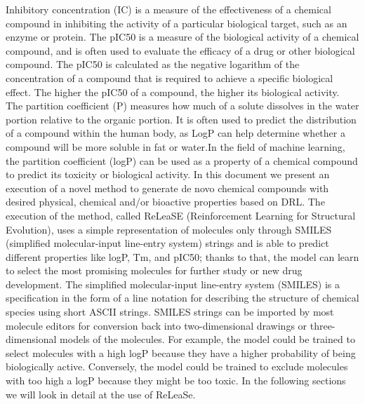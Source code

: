 \documentclass[a4paper]{article}
\begin{document}
Inhibitory concentration (IC) is a measure of the effectiveness of a chemical compound in inhibiting the activity of a particular biological target, such as an enzyme or protein. The pIC50 is a measure of the biological activity of a chemical compound, and is often used to evaluate the efficacy of a drug or other biological compound. The pIC50 is calculated as the negative logarithm of the concentration of a compound that is required to achieve a specific biological effect. The higher the pIC50 of a compound, the higher its biological activity.
The partition coefficient (P) measures how much of a solute dissolves in the water portion relative to the organic portion. It is often used to predict the distribution of a compound within the human body, as LogP can help determine whether a compound will be more soluble in fat or water.In the field of machine learning, the partition coefficient (logP) can be used as a property of a chemical compound to predict its toxicity or biological activity.
In this document we present an execution of a novel method to generate de novo chemical compounds with desired physical, chemical and/or bioactive properties based on DRL. The execution of the method, called ReLeaSE (Reinforcement Learning for Structural Evolution), uses a simple representation of molecules only through SMILES (simplified molecular-input line-entry system) strings and is able to predict different properties like logP, Tm, and pIC50; thanks to that, the model can learn to select the most promising molecules for further study or new drug development. 
The simplified molecular-input line-entry system (SMILES) is a specification in the form of a line notation for describing the structure of chemical species using short ASCII strings. SMILES strings can be imported by most molecule editors for conversion back into two-dimensional drawings or three-dimensional models of the molecules.
For example, the model could be trained to select molecules with a high logP because they have a higher probability of being biologically active. Conversely, the model could be trained to exclude molecules with too high a logP because they might be too toxic.
In the following sections we will look in detail at the use of ReLeaSe.
\end{document}
